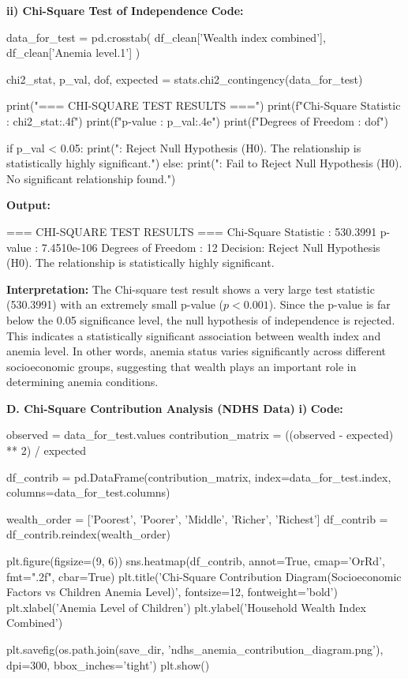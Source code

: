 \documentclass[12pt,a4paper]{article}
\begin{document}
\textbf{ii) Chi-Square Test of Independence}
\textbf{Code:}
\begin{codebox}
data_for_test = pd.crosstab(
    df_clean['Wealth index combined'],
    df_clean['Anemia level.1']
)

chi2_stat, p_val, dof, expected =
stats.chi2_contingency(data_for_test)

print("=== CHI-SQUARE TEST RESULTS ===")
print(f"Chi-Square Statistic : {chi2_stat:.4f}")
print(f"p-value : {p_val:.4e}")
print(f"Degrees of Freedom : {dof}")

if p_val < 0.05:
    print("\nDecision: Reject Null Hypothesis (H0).
    The relationship is statistically highly significant.")
else:
    print("\nDecision: Fail to
    Reject Null Hypothesis (H0). 
    No significant relationship found.")
\end{codebox}

\textbf{Output:}
\begin{codebox}
=== CHI-SQUARE TEST RESULTS ===
Chi-Square Statistic : 530.3991
p-value : 7.4510e-106
Degrees of Freedom : 12
Decision: Reject Null Hypothesis (H0). 
The relationship is statistically highly significant.
\end{codebox}

\textbf{Interpretation:}
The Chi-square test result shows a very large test statistic (530.3991) with an extremely small p-value ($p < 0.001$).
Since the p-value is far below the 0.05 significance level, the null hypothesis of independence is rejected.
This indicates a statistically significant association between wealth index and anemia level.
In other words, anemia status varies significantly across different socioeconomic groups, suggesting that wealth plays an important role in determining anemia conditions.

\textbf{D. Chi-Square Contribution Analysis (NDHS Data)}
\textbf{i)}
\textbf{Code:}
\begin{codebox}

observed = data_for_test.values
contribution_matrix = ((observed - expected) ** 2) / expected


df_contrib = pd.DataFrame(contribution_matrix,
                          index=data_for_test.index,
                          columns=data_for_test.columns)


wealth_order = ['Poorest', 'Poorer', 'Middle', 
'Richer', 'Richest']
df_contrib = df_contrib.reindex(wealth_order)


plt.figure(figsize=(9, 6))
sns.heatmap(df_contrib, annot=True, cmap='OrRd',
fmt=".2f", cbar=True)
plt.title('Chi-Square Contribution 
Diagram\n(Socioeconomic Factors vs 
Children Anemia Level)',
          fontsize=12, fontweight='bold')
plt.xlabel('Anemia Level of Children')
plt.ylabel('Household Wealth Index Combined')


plt.savefig(os.path.join(save_dir, 
'ndhs_anemia_contribution_diagram.png'), dpi=300, bbox_inches='tight')
plt.show()
\end{codebox}
\end{document}
